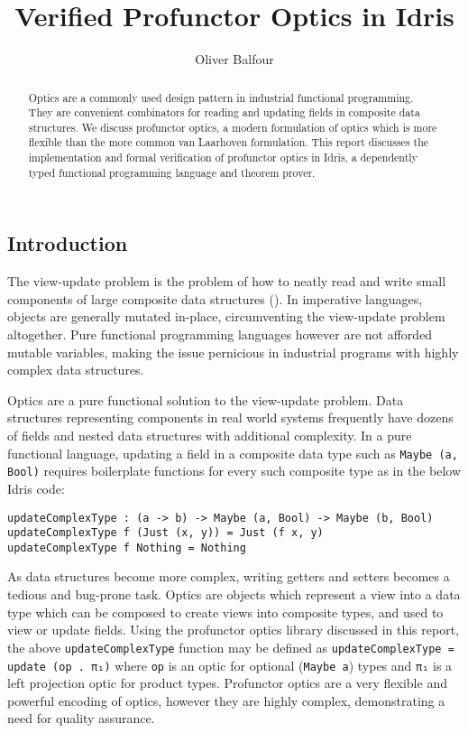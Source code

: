 \documentclass[11pt]{report}
\title{Verified Profunctor Optics in Idris}
\author{Oliver Balfour}
\begin{document}
\maketitle
\begin{spacing}{1.15}

\begin{abstract}
Optics are a commonly used design pattern in industrial functional programming. They are convenient combinators for reading and updating fields in composite data structures. We discuss profunctor optics, a modern formulation of optics which is more flexible than the more common van Laarhoven formulation. This report discusses the implementation and formal verification of profunctor optics in Idris, a dependently typed functional programming language and theorem prover.
\end{abstract}

\tableofcontents
\newpage

\section{Introduction}

The view-update problem is the problem of how to neatly read and write small components of large composite data structures (\cite{foster2005combinators}). In imperative languages, objects are generally mutated in-place, circumventing the view-update problem altogether. Pure functional programming languages however are not afforded mutable variables, making the issue pernicious in industrial programs with highly complex data structures.

Optics are a pure functional solution to the view-update problem. Data structures representing components in real world systems frequently have dozens of fields and nested data structures with additional complexity. In a pure functional language, updating a field in a composite data type such as \texttt{Maybe (a, Bool)} requires boilerplate functions for every such composite type as in the below Idris code:

\begin{verbatim}
updateComplexType : (a -> b) -> Maybe (a, Bool) -> Maybe (b, Bool)
updateComplexType f (Just (x, y)) = Just (f x, y)
updateComplexType f Nothing = Nothing
\end{verbatim}

As data structures become more complex, writing getters and setters becomes a tedious and bug-prone task. Optics are objects which represent a view into a data type which can be composed to create views into composite types, and used to view or update fields. Using the profunctor optics library discussed in this report, the above \texttt{updateComplexType} function may be defined as \texttt{updateComplexType = update (op . π₁)} where \texttt{op} is an optic for optional (\texttt{Maybe a}) types and \texttt{π₁} is a left projection optic for product types. Profunctor optics are a very flexible and powerful encoding of optics, however they are highly complex, demonstrating a need for quality assurance.


\end{spacing}
\end{document}
